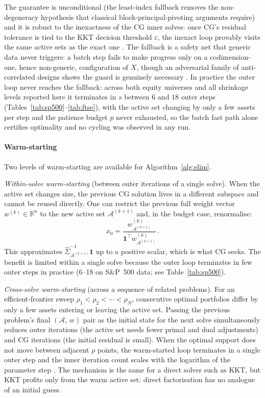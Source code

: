 The guarantee is unconditional (the least-index fallback removes the non-degeneracy
hypothesis that classical block-principal-pivoting arguments require) and it is
robust to the inexactness of the CG inner solves: once CG's residual tolerance is tied
to the KKT decision threshold $\varepsilon$, the inexact loop provably visits the same
active sets as the exact one \cite[Lemma~4.1]{schmelzer2026nncg}. The fallback is a
safety net that generic data never triggers: a batch step fails to make progress only
on a codimension-one, hence non-generic, configuration of $X$, though an adversarial
family of anti-correlated designs shows the guard is genuinely necessary
\cite[Section~6.2]{schmelzer2026nncg}. In practice the outer loop never reaches the
fallback: across both equity universes and all shrinkage levels reported here it
terminates in $s$ between $6$ and $18$ outer steps
(Tables~\ref{tab:sp500}--\ref{tab:ftse}), with the active set changing by only a few
assets per step and the patience budget $p$ never exhausted, so the batch fast path
alone certifies optimality and no cycling was observed in any run.

\paragraph{Warm-starting}
Two levels of warm-starting are available for Algorithm~\ref{alg:elim}.

\emph{Within-solve warm-starting} (between outer iterations of a single solve).
When the active set changes size, the previous CG solution lives in a different
subspace and cannot be reused directly. One can restrict the previous full
weight vector $w^{(k)} \in \mathbb{R}^n$ to the new active set
$\mathcal{A}^{(k+1)}$ and, in the budget case, renormalise:
\[
  x_0 = \frac{w^{(k)}_{\mathcal{A}^{(k+1)}}}
             {\mathbf{1}^\top w^{(k)}_{\mathcal{A}^{(k+1)}}}\,.
\]
This approximates $\hat\Sigma_{\mathcal{A}^{(k+1)}}^{-1}\mathbf{1}$ up to a
positive scalar, which is what CG seeks.
The benefit is limited within a single solve because the outer loop terminates in few outer steps in practice (6--18 on S\&P~500 data; see Table~\ref{tab:sp500}).

\emph{Cross-solve warm-starting} (across a sequence of related problems).
For an efficient-frontier sweep $\rho_1 < \rho_2 < \cdots < \rho_N$, consecutive
optimal portfolios differ by only a few assets entering or leaving the active
set.
Passing the previous problem's final $(\mathcal{A},\,w)$ pair as the
initial state for the next solve simultaneously reduces outer iterations (the
active set needs fewer primal and dual adjustments) and CG iterations (the
initial residual is small). When the optimal support does not move between
adjacent $\rho$ points, the warm-started loop terminates in a single outer step
and the inner iteration count scales with the logarithm of the parameter step
\cite[Proposition~4.2]{schmelzer2026nncg}.
The mechanism is the same for a direct solver
such as KKT, but KKT profits only from the warm active set: direct
factorisation has no analogue of an initial guess.

